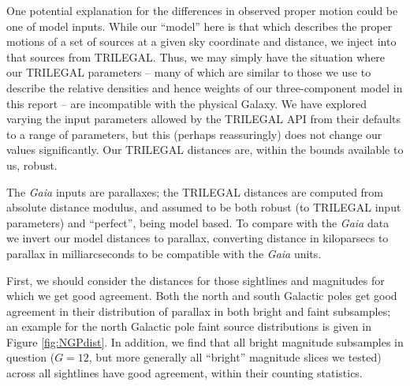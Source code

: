 \documentclass[fleqn,usenatbib]{mnras}
\begin{document}
One potential explanation for the differences in observed proper motion could be one of model inputs.
While our ``model'' here is that which describes the proper motions of a set of sources at a given sky coordinate and distance, we inject into that sources from TRILEGAL.
Thus, we may simply have the situation where our TRILEGAL parameters -- many of which are similar to those we use to describe the relative densities and hence weights of our three-component model in this report -- are incompatible with the physical Galaxy.
We have explored varying the input parameters allowed by the TRILEGAL API from their defaults to a range of parameters, but this (perhaps reassuringly) does not change our values significantly.
Our TRILEGAL distances are, within the bounds available to us, robust.

The \textit{Gaia} inputs are parallaxes; the TRILEGAL distances are computed from absolute distance modulus, and assumed to be both robust (to TRILEGAL input parameters) and ``perfect'', being model based.
To compare with the \textit{Gaia} data we invert our model distances to parallax, converting distance in kiloparsecs to parallax in milliarcseconds to be compatible with the \textit{Gaia} units.

First, we should consider the distances for those sightlines and magnitudes for which we get good agreement.
Both the north and south Galactic poles get good agreement in their distribution of parallax in both bright and faint subsamples; an example for the north Galactic pole faint source distributions is given in Figure \ref{fig:NGPdist}.
In addition, we find that all bright magnitude subsamples in question ($G = 12$, but more generally all ``bright'' magnitude slices we tested) across all sightlines have good agreement, within their counting statistics.
\end{document}
